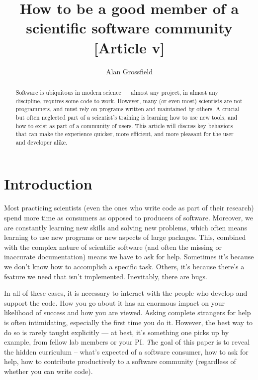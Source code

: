 \documentclass[9pt,training]{livecoms}
\title{How to be a good member of a scientific software community [Article v\versionnumber]}
\author[1*]{Alan Grossfield}
\affil[1]{University of Rochester Medical Center, Department of Biochemistry and Biophysics}
\begin{document}
\begin{frontmatter}
\maketitle

\begin{abstract}

Software is ubiquitous in modern science --- almost any project, in almost any
discipline, requires some code to work. However, many (or even most) scientists
are not programmers, and must rely on programs written and maintained by others.
A crucial but often neglected part of a scientist's training is
learning how to use new tools, and how to exist as part of a community of users.
This article will discuss key behaviors that can make the experience quicker,
more efficient, and more pleasant for the user and developer alike.


\end{abstract}

\end{frontmatter}




\section{Introduction}

Most practicing scientists (even the ones who write code as part of their
research) spend more time as consumers as opposed to producers of software.
Moreover, we are constantly learning new skills and solving new problems, which
often means learning to use new programs or new aspects of large packages. This,
combined with the complex nature of scientific software (and often the missing
or inaccurate documentation) means we have to ask for help.  Sometimes it's
because we don't know how to accomplish a specific task. Others, it's because
there's a feature we need that isn't implemented. Inevitably, there are bugs.

In all of these cases, it is necessary to interact with the people who develop
and support the code. How you go about it has an enormous impact on your
likelihood of success and how you are viewed. Asking complete strangers for help
is often intimidating, especially the first time you do it. However, the best
way to do so is rarely taught explicitly --- at best, it's something one picks
up by example, from fellow lab members or your PI.  {\emph The goal of this
paper is to reveal the hidden curriculum -- what's expected of a software
consumer, how to ask for help, how to contribute productively to a software
community (regardless of whether you can write code).}
\end{document}
